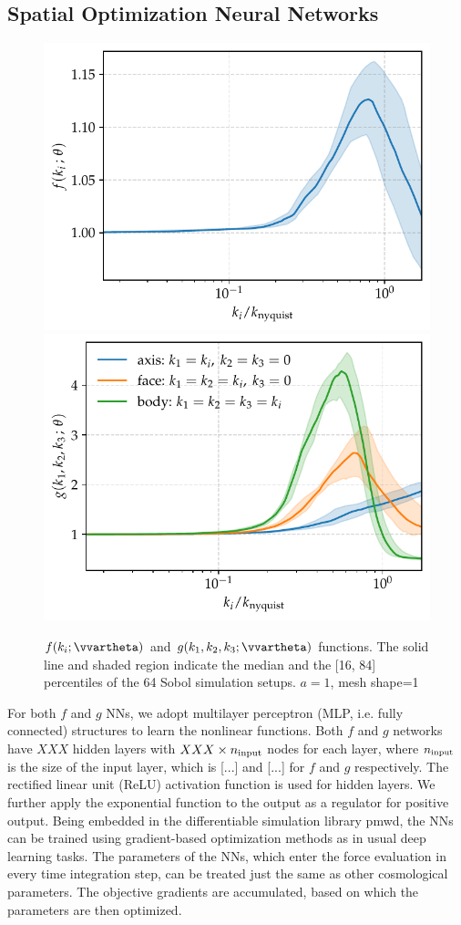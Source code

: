 \documentclass[modern, trackchanges, dvipsnames]{aastex631}
\newcommand{\pmwd}{{\usefont{T1}{nova}{m}{sl}pmwd}}
\begin{document}
\subsection{Spatial Optimization Neural Networks}

\begin{figure}
  \centering
  \includegraphics[width=.48\columnwidth]{net_f_a1_j3091776_e3000.pdf}
  \includegraphics[width=.48\columnwidth]{net_g_a1_j3091776_e3000.pdf}
  \caption{$f(k_i; \vvartheta)$ and $g(k_1, k_2, k_3; \vvartheta)$
  functions. The solid line and shaded region indicate the median and
  the [16, 84] percentiles of the 64 Sobol simulation setups. $a=1$,
  mesh shape=1}
  \label{fig:func}
\end{figure}

For both $f$ and $g$ NNs, we adopt multilayer perceptron (MLP, i.e.
fully connected) structures to learn the nonlinear functions.
Both $f$ and $g$ networks have $XXX$ hidden layers with $XXX\times n_{\rm
input}$ nodes for each layer, where $n_{\rm input}$ is the size of the
input layer, which is [...] and [...] for $f$ and $g$ respectively.
The rectified linear unit (ReLU) activation function is used for hidden
layers.
We further apply the exponential function to the output as a regulator
for positive output.
Being embedded in the differentiable simulation library \pmwd, the NNs
can be trained using gradient-based optimization methods as in usual
deep learning tasks.
The parameters of the NNs, which enter the force evaluation in every
time integration step, can be treated just the same as other
cosmological parameters.
The objective gradients are accumulated, based on which the parameters
are then optimized.
\end{document}
